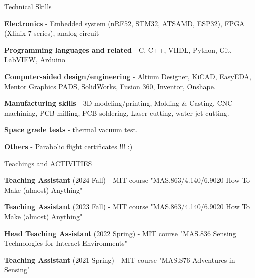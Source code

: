 \documentclass{resume} %
\begin{document}
%


\begin{rSection}{Technical Skills}

\begin{itemlabel}

\item \textbf{Electronics} - Embedded system (nRF52, STM32, ATSAMD, ESP32), FPGA (Xlinix 7 series), analog circuit
\smallskip
\smallskip

\item \textbf{Programming languages and related} - C, C++, VHDL, Python, Git, LabVIEW, Arduino
\smallskip
\smallskip

\item \textbf{Computer-aided design/engineering} - Altium Designer, KiCAD, EasyEDA, Mentor Graphics PADS, SolidWorks, Fusion 360, Inventor, Onshape.
\smallskip
\smallskip

\item \textbf{Manufacturing skills} - 3D modeling/printing, Molding \& Casting, CNC machining, PCB milling, PCB soldering, Laser cutting, water jet cutting.
\smallskip
\smallskip

\item \textbf{Space grade tests} - thermal vacuum test.
\smallskip
\smallskip

\item \textbf{Others} - Parabolic flight certificates !!! :)
\smallskip
\smallskip

\end{itemlabel}
\end{rSection}

\begin{rSection}{Teachings and ACTIVITIES}

\begin{itemlabel}
\item \textbf{Teaching Assistant} (2024 Fall) - MIT course "MAS.863/4.140/6.9020 How To Make (almost) Anything"
\smallskip
\smallskip
    

\item \textbf{Teaching Assistant} (2023 Fall) - MIT course "MAS.863/4.140/6.9020 How To Make (almost) Anything"
\smallskip
\smallskip

\item \textbf{Head Teaching Assistant} (2022 Spring) - MIT course "MAS.836 Sensing Technologies for Interact Environments"
\smallskip
\smallskip

\item \textbf{Teaching Assistant} (2021 Spring) - MIT course "MAS.S76 Adventures in Sensing"

\end{itemlabel}
\end{rSection}
\end{document}
